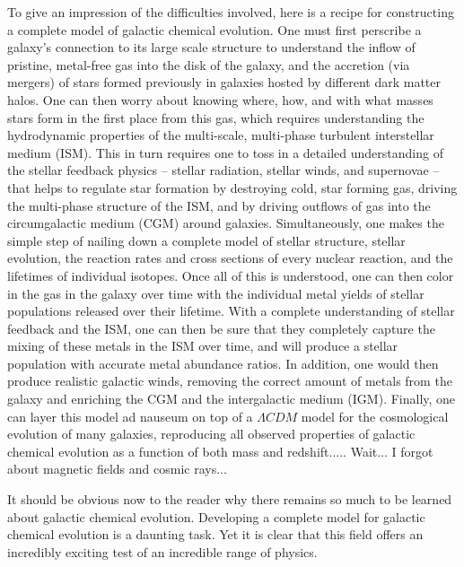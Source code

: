 To give an impression of the difficulties involved, here is a recipe for constructing a complete model of galactic chemical evolution. One must first perscribe a galaxy's connection to its large scale structure to understand the inflow of pristine, metal-free gas into the disk of the galaxy, and the accretion (via mergers) of stars formed previously in galaxies hosted by different dark matter halos. One can then worry about knowing where, how, and with what masses stars form in the first place from this gas, which requires understanding the hydrodynamic 
properties of the multi-scale, multi-phase turbulent interstellar medium (ISM). This in turn requires one to toss in a detailed understanding of the stellar feedback physics -- stellar radiation, stellar winds, and supernovae -- that helps to regulate star formation by destroying cold, star forming gas, driving the multi-phase structure of the ISM, and by driving outflows of gas into the circumgalactic medium (CGM) around galaxies. Simultaneously, one makes the simple step of nailing down a complete model of stellar structure, stellar evolution, the reaction rates and cross sections of every nuclear reaction, and the lifetimes of individual isotopes. Once all of this is understood, one can then color in the gas in the galaxy over time with the individual metal yields of stellar populations released over their lifetime. With a complete understanding of stellar feedback and the ISM, one can then be sure that they completely capture the mixing of these metals in the ISM over time, and will produce a stellar population with accurate metal abundance ratios. In addition, one would then produce realistic galactic winds, removing the correct amount of metals from the galaxy and enriching the CGM and the intergalactic medium (IGM). Finally, one can layer this model ad nauseum on top of a $\Lambda CDM$ model for the cosmological evolution of many galaxies, reproducing all observed properties of galactic chemical evolution as a function of both mass and redshift..... Wait... I forgot about magnetic fields and cosmic rays...

It should be obvious now to the reader why there remains so much to be learned about galactic chemical evolution. Developing a complete model for galactic chemical evolution is a daunting task. Yet it is clear that this field offers an incredibly exciting test of an incredible range of physics.


